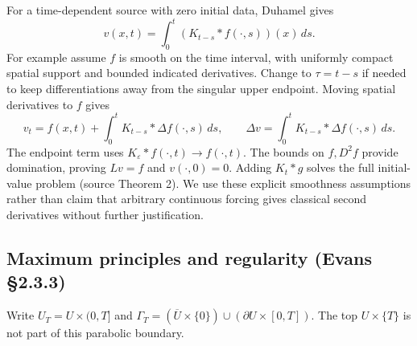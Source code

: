 For a time-dependent source with zero initial data, Duhamel gives
\[
 v(x,t)=\int_0^t(K_{t-s}*f(\cdot,s))(x)\,ds.
\]
For example assume $f$ is smooth on the time interval, with uniformly
compact spatial support and bounded indicated derivatives.
Change to $\tau=t-s$ if needed to keep differentiations away from
the singular upper endpoint. Moving spatial derivatives to $f$ gives
\[
 v_t=f(x,t)+\int_0^tK_{t-s}*\Delta f(\cdot,s)\,ds,\qquad
 \Delta v=\int_0^tK_{t-s}*\Delta f(\cdot,s)\,ds.
\]
The endpoint term uses $K_\varepsilon*f(\cdot,t)\to f(\cdot,t)$.
The bounds on $f,D^2f$ provide domination, proving $Lv=f$ and
$v(\cdot,0)=0$.
Adding $K_t*g$ solves the full initial-value problem
(source Theorem 2). We use these explicit smoothness assumptions
rather than claim that arbitrary continuous forcing gives classical
second derivatives without further justification.



\subsection{Maximum principles and regularity (Evans \S2.3.3)}
Write $U_T=U\times(0,T]$ and
$\Gamma_T=(\overline U\times\{0\})\cup(\partial U\times[0,T])$.
The top $U\times\{T\}$ is not part of this parabolic boundary.

